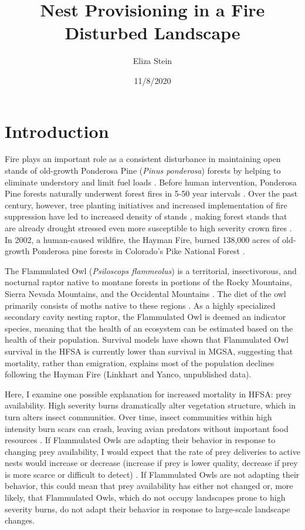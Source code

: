 \documentclass[
]{article}
\title{Nest Provisioning in a Fire Disturbed Landscape}
\author{Eliza Stein}
\date{11/8/2020}
\begin{document}
\maketitle

\hypertarget{introduction}{%
\section{Introduction}\label{introduction}}

Fire plays an important role as a consistent disturbance in maintaining
open stands of old-growth Ponderosa Pine (\emph{Pinus ponderosa})
forests by helping to eliminate understory and limit fuel loads
\citep{veblen2000climatic}. Before human intervention, Ponderosa Pine
forests naturally underwent forest fires in 5-50 year intervals
\citep{veblen2000climatic}. Over the past century, however, tree
planting initiatives and increased implementation of fire suppression
have led to increased density of stands \citep{griffis2001understory},
making forest stands that are already drought stressed even more
susceptible to high severity crown fires \citep{veblen2000climatic}. In
2002, a human-caused wildfire, the Hayman Fire, burned 138,000 acres of
old-growth Ponderosa pine forests in Colorado's Pike National Forest
\citep{graham2003hayman}.

The Flammulated Owl (\emph{Psiloscops flammeolus}) is a territorial,
insectivorous, and nocturnal raptor native to montane forests in
portions of the Rocky Mountains, Sierra Nevada Mountains, and the
Occidental Mountains \citep{linkhart2013flammulated}. The diet of the
owl primarily consists of moths native to these regions
\citep{linkhart2013flammulated}. As a highly specialized secondary
cavity nesting raptor, the Flammulated Owl is deemed an indicator
species, meaning that the health of an ecosystem can be estimated based
on the health of their population. Survival models have shown that
Flammulated Owl survival in the HFSA is currently lower than survival in
MGSA, suggesting that mortality, rather than emigration, explains most
of the population declines following the Hayman Fire (Linkhart and
Yanco, unpublished data).

Here, I examine one possible explanation for increased mortality in
HFSA: prey availability. High severity burns dramatically alter
vegetation structure, which in turn alters insect communities. Over
time, insect communities within high intensity burn scars can crash,
leaving avian predators without important food resources
\citep{nappi2010effect}. If Flammulated Owls are adapting their behavior
in response to changing prey availability, I would expect that the rate
of prey deliveries to active nests would increase or decrease (increase
if prey is lower quality, decrease if prey is more scarce or difficult
to detect) \citep{zarybnicka2009tengmalm}. If Flammulated Owls are not
adapting their behavior, this could mean that prey availability has
either not changed or, more likely, that Flammulated Owls, which do not
occupy landscapes prone to high severity burns, do not adapt their
behavior in response to large-scale landscape changes.

  
\end{document}
